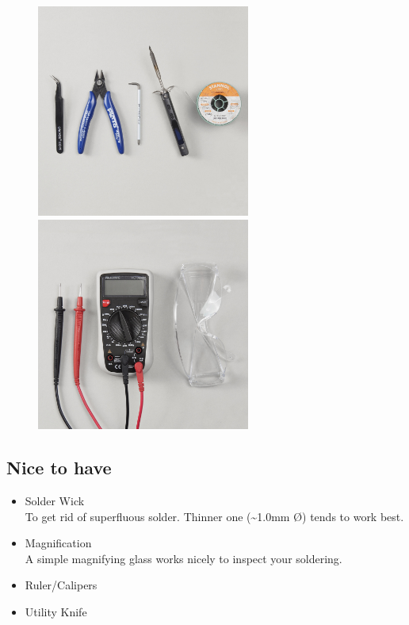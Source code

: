 \documentclass[12pt, a4paper]{article}
\begin{document}
\begin{figure}[H]
    \centering
    \includegraphics[width=7cm]{images/tools_1.jpg}
    \hspace{2mm}
    \includegraphics[width=7cm]{images/tools_2.jpg}
\end{figure}

\subsection*{Nice to have}

\begin{itemize}
    \item Solder Wick
    \\ {\small To get rid of superfluous solder.
    Thinner one (\textasciitilde1.0mm \O) tends to work best.}
    \item Magnification
    \\ {\small A simple magnifying glass works nicely to inspect your soldering.}
    \item Ruler/Calipers
    \item Utility Knife
\end{itemize}

\pagebreak
\renewcommand{\contentsname}{Build Steps}
\tableofcontents
\end{document}
